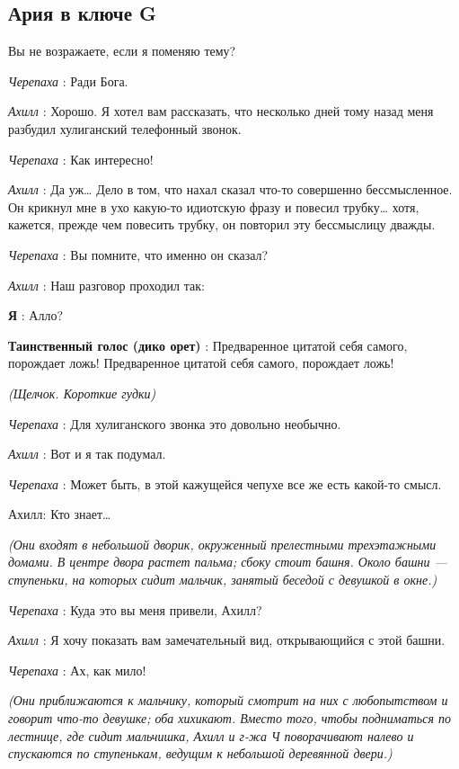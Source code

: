 \documentclass[../main.tex]{subfiles}
\begin{document}
\subsection{Ария в ключе G}


\begin{dialogue}

 Вы не возражаете, если я поменяю тему?

\emph{Черепаха} : Ради Бога.

\emph{Ахилл} : Хорошо. Я хотел вам рассказать, что несколько дней тому назад меня разбудил хулиганский телефонный звонок.

\emph{Черепаха} : Как интересно!

\emph{Ахилл} : Да уж\ldots{} Дело в том, что нахал сказал что-то совершенно бессмысленное. Он крикнул мне в ухо какую-то идиотскую фразу и повесил трубку\ldots{} хотя, кажется, прежде чем повесить трубку, он повторил эту бессмыслицу дважды.

\emph{Черепаха} : Вы помните, что именно он сказал?

\emph{Ахилл} : Наш разговор проходил так:

\textbf{Я} : Алло?

\textbf{Таинственный голос (дико орет)} : Предваренное цитатой себя самого, порождает ложь! Предваренное цитатой себя самого, порождает ложь!

\emph{(Щелчок. Короткие гудки)}

\emph{Черепаха} : Для хулиганского звонка это довольно необычно.

\emph{Ахилл} : Вот и я так подумал.

\emph{Черепаха} : Может быть, в этой кажущейся чепухе все же есть какой-то смысл.

Ахилл: Кто знает\ldots{}

\emph{(Они входят в небольшой дворик, окруженный прелестными трехэтажными домами. В центре двора растет пальма; сбоку стоит башня. Около башни --- ступеньки, на которых сидит мальчик, занятый беседой с девушкой в окне.)}

\emph{Черепаха} : Куда это вы меня привели, Ахилл?

\emph{Ахилл} : Я хочу показать вам замечательный вид, открывающийся с этой башни.

\emph{Черепаха} : Ах, как мило!

\emph{(Они приближаются к мальчику, который смотрит на них с любопытством и говорит что-то девушке; оба хихикают. Вместо того, чтобы подниматься по лестнице, где сидит мальчишка, Ахилл и г-жа Ч поворачивают налево и спускаются по ступенькам, ведущим к небольшой деревянной двери.)}


\end{dialogue}
\end{document}

